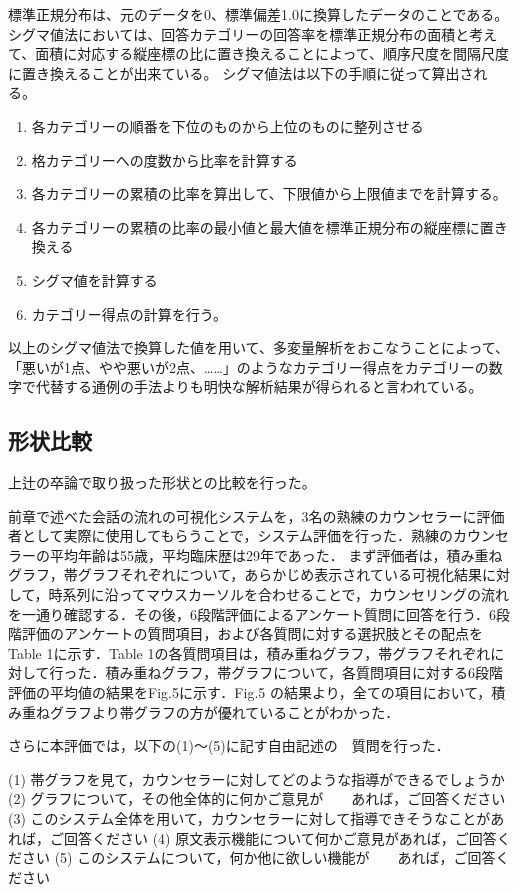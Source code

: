 \documentclass[shuuron]{kuee}
\begin{document}
標準正規分布は、元のデータを0、標準偏差1.0に換算したデータのことである。シグマ値法においては、回答カテゴリーの回答率を標準正規分布の面積と考えて、面積に対応する縦座標の比に置き換えることによって、順序尺度を間隔尺度に置き換えることが出来ている。
シグマ値法は以下の手順に従って算出される。
\begin{enumerate}
 \item 各カテゴリーの順番を下位のものから上位のものに整列させる
 \item 格カテゴリーへの度数から比率を計算する
 \item 各カテゴリーの累積の比率を算出して、下限値から上限値までを計算する。
 \item 各カテゴリーの累積の比率の最小値と最大値を標準正規分布の縦座標に置き換える
 \item シグマ値を計算する
 \item カテゴリー得点の計算を行う。
\end{enumerate}

以上のシグマ値法で換算した値を用いて、多変量解析をおこなうことによって、「悪いが1点、やや悪いが2点、……」のようなカテゴリー得点をカテゴリーの数字で代替する通例の手法よりも明快な解析結果が得られると言われている。


\subsection{形状比較}
上辻の卒論で取り扱った形状との比較を行った。

前章で述べた会話の流れの可視化システムを，3名の熟練のカウンセラーに評価者として実際に使用してもらうことで，システム評価を行った．熟練のカウンセラーの平均年齢は55歳，平均臨床歴は29年であった．
まず評価者は，積み重ねグラフ，帯グラフそれぞれについて，あらかじめ表示されている可視化結果に対して，時系列に沿ってマウスカーソルを合わせることで，カウンセリングの流れを一通り確認する．その後，6段階評価によるアンケート質問に回答を行う．6段階評価のアンケートの質問項目，および各質問に対する選択肢とその配点をTable 1に示す．Table 1の各質問項目は，積み重ねグラフ，帯グラフそれぞれに対して行った．積み重ねグラフ，帯グラフについて，各質問項目に対する6段階評価の平均値の結果をFig.5に示す．Fig.5 の結果より，全ての項目において，積み重ねグラフより帯グラフの方が優れていることがわかった．


さらに本評価では，以下の(1)～(5)に記す自由記述の　質問を行った．

(1)	帯グラフを見て，カウンセラーに対してどのような指導ができるでしょうか
(2)	グラフについて，その他全体的に何かご意見が　　あれば，ご回答ください
(3)	このシステム全体を用いて，カウンセラーに対して指導できそうなことがあれば，ご回答ください
(4)	原文表示機能について何かご意見があれば，ご回答ください
(5)	このシステムについて，何か他に欲しい機能が　　あれば，ご回答ください
\end{document}
